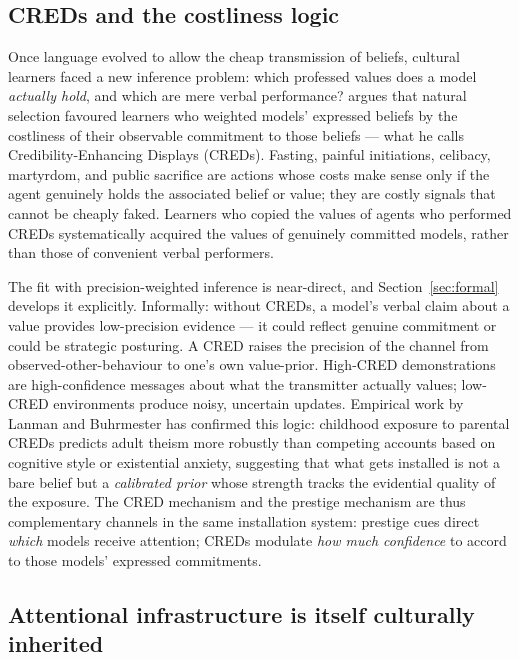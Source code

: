 \subsection*{CREDs and the costliness logic}

Once language evolved to allow the cheap transmission of beliefs, cultural
learners faced a new inference problem: which professed values does a model
\emph{actually hold}, and which are mere verbal performance?
\citet{henrich2009CREDs} argues that natural selection favoured learners who
weighted models' expressed beliefs by the costliness of their observable
commitment to those beliefs — what he calls Credibility-Enhancing Displays
(CREDs).
Fasting, painful initiations, celibacy, martyrdom, and public sacrifice are
actions whose costs make sense only if the agent genuinely holds the associated
belief or value; they are costly signals that cannot be cheaply faked.
Learners who copied the values of agents who performed CREDs systematically
acquired the values of genuinely committed models, rather than those of
convenient verbal performers.

The fit with precision-weighted inference is near-direct, and Section~\ref{sec:formal}
develops it explicitly.
Informally: without CREDs, a model's verbal claim about a value provides
low-precision evidence — it could reflect genuine commitment or could be
strategic posturing.
A CRED raises the precision of the channel from observed-other-behaviour to
one's own value-prior.
High-CRED demonstrations are high-confidence messages about what the transmitter
actually values; low-CRED environments produce noisy, uncertain updates.
Empirical work by Lanman and Buhrmester \citep{lanmanBuhrmester2017CREDs} has
confirmed this logic: childhood exposure to parental CREDs predicts adult theism
more robustly than competing accounts based on cognitive style or existential
anxiety, suggesting that what gets installed is not a bare belief but a
\emph{calibrated prior} whose strength tracks the evidential quality of the
exposure.
The CRED mechanism and the prestige mechanism are thus complementary channels in
the same installation system: prestige cues direct \emph{which} models receive
attention; CREDs modulate \emph{how much confidence} to accord to those models'
expressed commitments.

\subsection*{Attentional infrastructure is itself culturally inherited}

